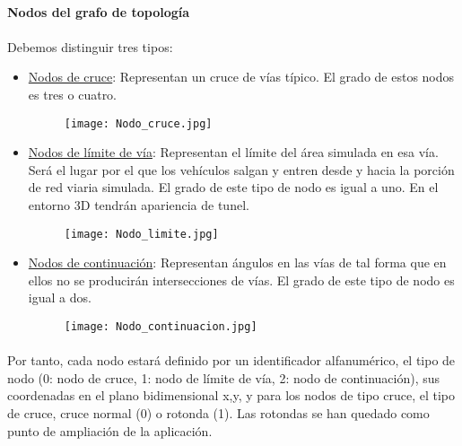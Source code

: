 	\paragraph{Nodos del grafo de topología}
	
	\paragraph{}
	Debemos distinguir tres tipos:
	\begin{itemize}
		\item \underline{Nodos de cruce}: Representan un cruce de vías típico. El grado de estos nodos es tres o cuatro.
		
		\begin{figure}[H]
			\centering
				\texttt{[image: Nodo\_cruce.jpg]}
		\end{figure}
	
		\item \underline{Nodos de límite de vía}: Representan el límite del área simulada en esa vía. Será el lugar por el que los vehículos salgan y entren desde y hacia la porción de red viaria simulada. El grado de este tipo de nodo es igual a uno. En el entorno 3D tendrán apariencia de tunel.
		
		\begin{figure}[H]
			\centering
				\texttt{[image: Nodo\_limite.jpg]}
		\end{figure}
	
		\item \underline{Nodos de continuación}: Representan ángulos en las vías de tal forma que en ellos no se producirán intersecciones de vías. El grado de este tipo de nodo es igual a dos.
		
		\begin{figure}[H]
			\centering
				\texttt{[image: Nodo\_continuacion.jpg]}
		\end{figure}
	
	\end{itemize}
	
	\paragraph{}
	Por tanto, cada nodo estará definido por un identificador alfanumérico, el tipo de nodo (0: nodo de cruce, 1: nodo de límite de vía, 2: nodo de continuación), sus coordenadas en el plano bidimensional x,y, y para los nodos de tipo cruce, el tipo de cruce, cruce normal (0) o rotonda (1). Las rotondas se han quedado como punto de ampliación de la aplicación.
	\newpage
